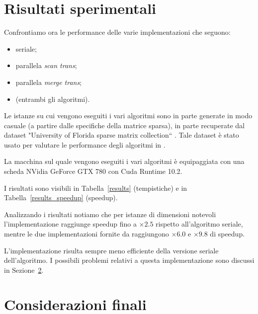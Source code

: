 

\section{Risultati sperimentali}

Confrontiamo ora le performance delle varie implementazioni che seguono:
\begin{itemize}
    \item seriale;
    \item parallela \emph{scan trans};
    \item parallela \emph{merge trans};
    \item \cuSPARSE   (entrambi gli algoritmi).
\end{itemize}

Le istanze su cui vengono eseguiti i vari algoritmi sono in parte generate in modo casuale (a partire dalle specifiche della matrice sparsa), in parte recuperate dal dataset "University  of Florida sparse  matrix collection`` \cite{dataset}. Tale dataset è stato usato per valutare le performance degli algoritmi in \cite{parallelTrans}.

La macchina sul quale vengono eseguiti i vari algoritmi è equipaggiata con una scheda NVidia GeForce GTX 780 con Cuda Runtime 10.2.

I risultati sono visibili in Tabella~\ref{results} (tempistiche) e in Tabella~\ref{results_speedup} (speedup).

Analizzando i risultati notiamo che per istanze di dimensioni notevoli l'implementazione \ScanTrans{} raggiunge speedup fino a $\times 2.5$ rispetto all'algoritmo seriale, mentre le due implementazioni fornite da \cuSPARSE{} raggiungono $\times 6.0$ e $\times 9.8$ di speedup. 

L'implementazione \MergeTrans{} risulta sempre meno efficiente della versione seriale dell'algoritmo. I possibili problemi relativi a questa implementazione sono discussi in Sezione~\ref{conclusioni}.





\section{Considerazioni finali}\label{conclusioni}

